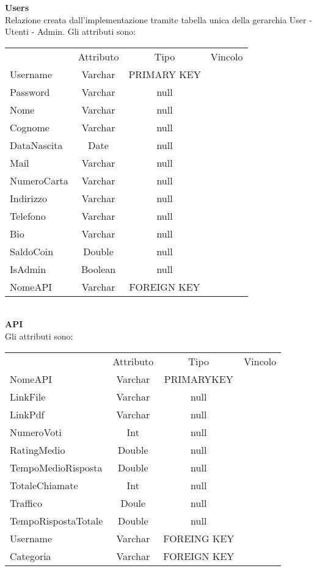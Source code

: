 {{		\textbf{Users}\\
			Relazione creata dall'implementazione tramite tabella unica della gerarchia User - Utenti - Admin. Gli attributi sono:
			\begin{center}
			\begin{tabular}{lccc}
				&Attributo&Tipo&Vincolo\\
				Username&Varchar&PRIMARY KEY\\
				Password&Varchar&null \\				
				Nome&Varchar&null \\
				Cognome&Varchar&null \\
				DataNascita&Date&null \\				
				Mail&Varchar&null \\
				NumeroCarta&Varchar&null \\
				Indirizzo&Varchar&null \\
				Telefono&Varchar&null \\
				Bio&Varchar&null \\
				SaldoCoin&Double&null \\
				IsAdmin&Boolean&null \\
				NomeAPI&Varchar&FOREIGN KEY\\
			\end{tabular}
			\end{center} \\					
			
		\textbf{API}\\
			Gli attributi sono:
			\begin{center}
			\begin{tabular}{lccc}
				&Attributo&Tipo&Vincolo\\
				NomeAPI&Varchar&PRIMARYKEY\\
				LinkFile&Varchar&null \\
				LinkPdf&Varchar&null \\
				NumeroVoti&Int&null \\
				RatingMedio&Double&null \\
				TempoMedioRisposta&Double&null \\
				TotaleChiamate&Int&null \\
				Traffico&Doule&null \\
				TempoRispostaTotale&Double&null \\
				Username&Varchar&FOREING KEY\\
				Categoria&Varchar&FOREIGN KEY\\
			\end{tabular}
			\end{center}\\
			
}}
